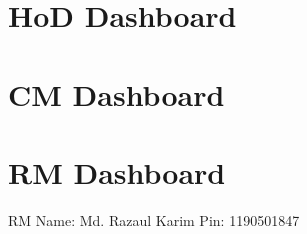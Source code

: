 \documentclass{article}
\begin{document}
\section{HoD Dashboard}

\section{CM Dashboard}

\section{RM Dashboard}
RM Name: Md. Razaul Karim Pin: 1190501847
\end{document}
